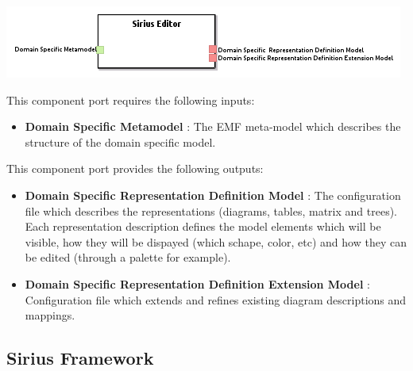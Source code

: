 \documentclass{gemoc} %
\begin{document}
\begin{center}
\includegraphics*[trim=0.0cm 0.0cm 0cm 0.0cm, clip=true]{../images/generated/Generated_Sirius_Editor.png}
\end{center}

This component port requires the following inputs:
\begin{itemize}
  \item \textbf{Domain Specific Metamodel} :
The EMF meta-model which describes the structure of the domain specific model.
\end{itemize}

This component port provides the following outputs:
\begin{itemize}
  \item \textbf{Domain Specific  Representation Definition Model} :
The configuration file which describes the representations (diagrams, tables, matrix and trees). Each representation description defines the model elements which will be visible, how they will be dispayed (which schape, color, etc) and how they can be edited (through a palette for example).
  \item \textbf{Domain Specific Representation Definition Extension Model} :
Configuration file which extends and refines existing diagram descriptions and mappings.
\end{itemize}


\subsection{Sirius Framework}

\end{document}
